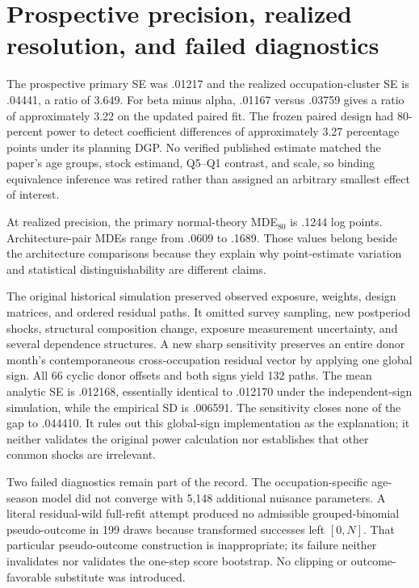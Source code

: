 \section{Prospective precision, realized resolution, and failed diagnostics}\label{app:power}

The prospective primary SE was .01217 and the realized occupation-cluster SE is .04441, a ratio of 3.649. For beta minus alpha, .01167 versus .03759 gives a ratio of approximately 3.22 on the updated paired fit. The frozen paired design had 80-percent power to detect coefficient differences of approximately 3.27 percentage points under its planning DGP. No verified published estimate matched the paper's age groups, stock estimand, Q5--Q1 contrast, and scale, so binding equivalence inference was retired rather than assigned an arbitrary smallest effect of interest.

At realized precision, the primary normal-theory MDE$_{80}$ is .1244 log points. Architecture-pair MDEs range from .0609 to .1689. Those values belong beside the architecture comparisons because they explain why point-estimate variation and statistical distinguishability are different claims.

The original historical simulation preserved observed exposure, weights, design matrices, and ordered residual paths. It omitted survey sampling, new postperiod shocks, structural composition change, exposure measurement uncertainty, and several dependence structures. A new sharp sensitivity preserves an entire donor month's contemporaneous cross-occupation residual vector by applying one global sign. All 66 cyclic donor offsets and both signs yield 132 paths. The mean analytic SE is .012168, essentially identical to .012170 under the independent-sign simulation, while the empirical SD is .006591. The sensitivity closes none of the gap to .044410. It rules out this global-sign implementation as the explanation; it neither validates the original power calculation nor establishes that other common shocks are irrelevant.

Two failed diagnostics remain part of the record. The occupation-specific age-season model did not converge with 5,148 additional nuisance parameters. A literal residual-wild full-refit attempt produced no admissible grouped-binomial pseudo-outcome in 199 draws because transformed successes left $[0,N]$. That particular pseudo-outcome construction is inappropriate; its failure neither invalidates nor validates the one-step score bootstrap. No clipping or outcome-favorable substitute was introduced.
